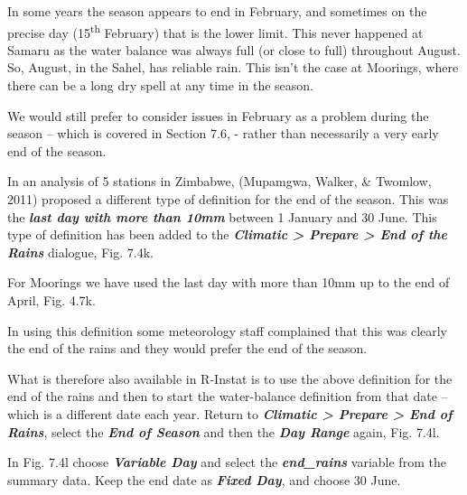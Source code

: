 \documentclass[
  letterpaper,
  DIV=11,
  numbers=noendperiod]{scrreprt}
\begin{document}
In some years the season appears to end in February, and sometimes on
the precise day (15\textsuperscript{th} February) that is the lower
limit. This never happened at Samaru as the water balance was always
full (or close to full) throughout August. So, August, in the Sahel, has
reliable rain. This isn't the case at Moorings, where there can be a
long dry spell at any time in the season.

We would still prefer to consider issues in February as a problem during
the season -- which is covered in Section 7.6, - rather than necessarily
a very early end of the season.

In an analysis of 5 stations in Zimbabwe, (Mupamgwa, Walker, \& Twomlow,
2011) proposed a different type of definition for the end of the season.
This was the \textbf{\emph{last day with more than 10mm}} between 1
January and 30 June. This type of definition has been added to the
\textbf{\emph{Climatic \textgreater{} Prepare \textgreater{} End of the
Rains}} dialogue, Fig. 7.4k.

For Moorings we have used the last day with more than 10mm up to the end
of April, Fig. 4.7k.

In using this definition some meteorology staff complained that this was
clearly the end of the rains and they would prefer the end of the
season.

What is therefore also available in R-Instat is to use the above
definition for the end of the rains and then to start the water-balance
definition from that date -- which is a different date each year. Return
to \textbf{\emph{Climatic \textgreater{} Prepare \textgreater{} End of
Rains}}, select the \textbf{\emph{End of Season}} and then the
\textbf{\emph{Day Range}} again, Fig. 7.4l.

In Fig. 7.4l choose \textbf{\emph{Variable Day}} and select the
\textbf{\emph{end\_rains}} variable from the summary data. Keep the end
date as \textbf{\emph{Fixed Day}}, and choose 30 June.
\end{document}
